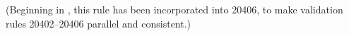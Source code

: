 (Beginning in \sbmltwofour, this rule has been incorporated into
20406, to make validation rules 20402--20406 parallel and
consistent.)
